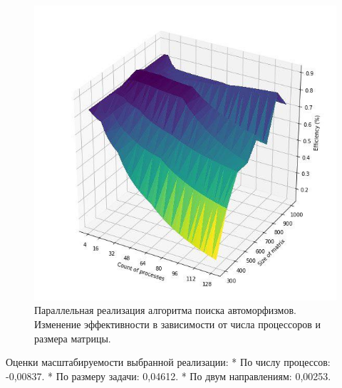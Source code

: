 \begin{figure}[ht]
\centering 
    \includegraphics[scale=0.8]{image/ef.jpg}
    \caption{Параллельная реализация алгоритма поиска автоморфизмов. Изменение эффективности в зависимости от числа процессоров и размера матрицы.}
    \label{srg}
\end{figure}

Оценки масштабируемости выбранной реализации:
*	По числу процессов: -0,00837.
*	По размеру задачи: 0,04612. 
*	По двум направлениям: 0,00253.

